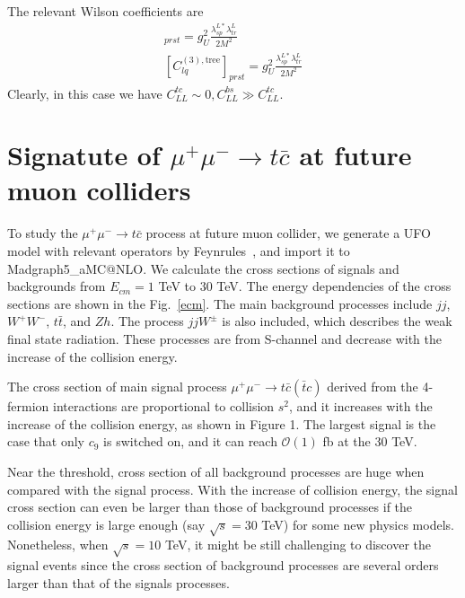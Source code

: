 \documentclass[a4paper,11pt]{article}
\makeatletter
\newcommand{\mgamc}{Madgraph5\_aMC@NLO}
\makeatother
\begin{document}
\begin{enumerate}
\begin{align}
        \end{align}
        The relevant Wilson coefficients are
        \begin{align}
            [C_{lq}^{(1),\textrm{tree}}]_{prst}=g_U^2\frac{\lambda_{sp}^{L*}\lambda_{tr}^{L}}{2M^2}\\
            [C_{lq}^{(3),\textrm{tree}}]_{prst}=g_U^2\frac{\lambda_{sp}^{L*}\lambda_{tr}^{L}}{2M^2}
        \end{align}
        Clearly, in this case we have $C_{LL}^{tc}\sim0,C_{LL}^{bs}\gg C_{LL}^{tc}$.
\end{enumerate}

\section{Signatute of $\mu^+\mu^-\to t\bar{c}$ at future muon colliders }
\label{Sec:result}

To study the $\mu^+\mu^-\to t\bar{c}$ process at future muon collider, 
we generate a UFO model with relevant operators by Feynrules~\cite{Alloul:2013bka}, 
and import it to \mgamc \cite{Alwall:2014hca}. 
We calculate the cross sections of signals and backgrounds from $E_{cm}=1$ TeV to $30$ TeV.  
The energy dependencies of the cross sections are shown in the Fig.~\ref{ecm}. 
The main background processes include $j j$, $W^+ W^-$, $t \bar{t}$, and $Zh$. The process $jj W^\pm$ is also included, which describes the weak final state radiation. These processes are from S-channel and decrease with the increase of the collision energy.

The cross section of main signal process $\mu^+ \mu^- \to t \bar{c} (\bar{t} c)$ derived from the 4-fermion interactions are proportional to collision $s^2$, and it increases with the increase of the collision energy, as shown in Figure 1. 
The largest signal is the case that only $c_{9}$ is switched on, and it can reach $\mathcal{O}(1)$ fb at the $30$ TeV. 

Near the threshold, cross section of all background processes are huge when compared with the signal process. With the increase of collision energy, the signal cross section can even be larger than those of background processes if the collision energy is large enough (say $\sqrt{s}=30$ TeV) for some new physics models. 
Nonetheless, when $\sqrt{s}=10$ TeV, it might be still challenging to discover the signal events since the cross section of background processes are several orders larger than that of the signals processes.
\end{document}
